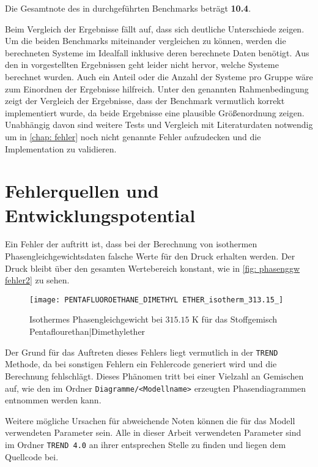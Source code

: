 \documentclass[../thesis.tex]{subfiles}
\begin{document}
Die Gesamtnote des in \cite{moine2021} durchgeführten Benchmarks beträgt \textbf{10.4}.

Beim Vergleich der Ergebnisse fällt auf, dass sich deutliche Unterschiede zeigen. Um die beiden Benchmarks miteinander vergleichen zu können, werden die berechneten Systeme im Idealfall inklusive deren berechnete Daten benötigt. Aus den in \cite{moine2021} vorgestellten Ergebnissen geht leider nicht hervor, welche Systeme berechnet wurden. Auch ein Anteil oder die Anzahl der Systeme pro Gruppe wäre zum Einordnen der Ergebnisse hilfreich. Unter den genannten Rahmenbedingung zeigt der Vergleich der Ergebnisse, dass der Benchmark vermutlich korrekt implementiert wurde, da beide Ergebnisse eine plausible Größenordnung zeigen. Unabhängig davon sind weitere Tests und Vergleich mit Literaturdaten notwendig um in \autoref{chap: fehler} noch nicht genannte Fehler aufzudecken und die Implementation zu validieren.


\chapter{Fehlerquellen und Entwicklungspotential}
\label{chap: fehler}

Ein Fehler der auftritt ist, dass bei der Berechnung von isothermen Phasengleichgewichtsdaten falsche Werte für den Druck erhalten werden. Der Druck bleibt über den gesamten Wertebereich konstant, wie in \autoref{fig: phasenggw fehler2} zu sehen.

\begin{figure}[htb]
	\centering
	\texttt{[image: PENTAFLUOROETHANE\_DIMETHYL ETHER\_isotherm\_313.15\_]}
	\caption{Isothermes Phasengleichgewicht bei $ 315$.$15$ K für das Stoffgemisch Pentaflourethan|Dimethylether}
	\label{fig: phasenggw fehler2}
\end{figure}
Der Grund für das Auftreten dieses Fehlers liegt vermutlich in der \texttt{TREND} Methode, da bei sonstigen Fehlern ein Fehlercode generiert wird und die Berechnung fehlschlägt. Dieses Phänomen tritt bei einer Vielzahl an Gemischen auf, wie den im Ordner \texttt{Diagramme/<Modellname>} erzeugten Phasendiagrammen  entnommen werden kann.

Weitere mögliche Ursachen für abweichende Noten können die für das Modell verwendeten Parameter sein. Alle in dieser Arbeit verwendeten Parameter sind im Ordner \texttt{TREND 4.0} an ihrer entsprechen Stelle zu finden und liegen dem Quellcode bei.
\end{document}
